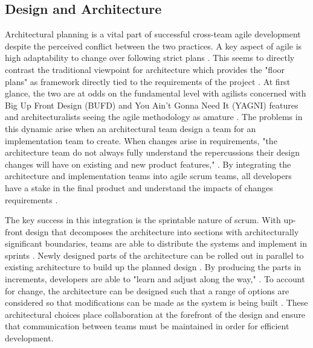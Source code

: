 \subsection{Design and Architecture}
Architectural planning is a vital part of successful cross-team agile development despite the perceived conflict between the two practices.
A key aspect of agile is high adaptability to change over following strict plans \cite{AgileMani}.
This seems to directly contrast the traditional viewpoint for architecture which provides the "floor plans" as framework directly tied to the requirements of the project \cite{perry1992foundations}.
At first glance, the two are at odds on the fundamental level with agilists concerned with Big Up Front Design (BUFD) and You Ain't Gonna Need It (YAGNI) features and architecturalists seeing the agile methodology as amature \cite{kruchten2010software}.
The problems in this dynamic arise when an architectural team design a team for an implementation team to create.
When changes arise in requirements, "the architecture team do not always fully understand the repercussions their design changes will have on existing and new product features," \cite{isham2008agile}.
By integrating the architecture and implementation teams into agile scrum teams, all developers have a stake in the final product and understand the impacts of changes requirements \cite{isham2008agile}.


The key success in this integration is the sprintable nature of scrum.
With up-front design that decomposes the architecture into sections with architecturally significant boundaries, teams are able to distribute the systems and implement in sprints \cite{madison2010agile}.
Newly designed parts of the architecture can be rolled out in parallel to existing architecture to build up the planned design \cite{isham2008agile}.
By producing the parts in increments, developers are able to "learn and adjust along the way," \cite{isham2008agile}.
To account for change, the architecture can be designed such that a range of options are considered so that modifications can be made as the system is being built \cite{madison2010agile}.
These architectural choices place collaboration at the forefront of the design and ensure that communication between teams must be maintained in order for efficient development.

